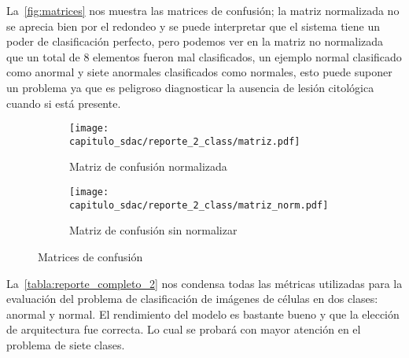\begin{table}[H]
    \centering
    \caption{Reporte de clasificación binario}\label{tabla:reporte_2}
    \end{table}

La~\autoref{fig:matrices} nos muestra las matrices de confusión; la matriz
normalizada no se aprecia bien por el redondeo y se puede interpretar que el
sistema tiene un poder de clasificación perfecto, pero podemos ver en la matriz
no normalizada que un total de 8 elementos fueron mal clasificados, un ejemplo
normal clasificado como anormal y siete anormales clasificados como normales,
esto puede suponer un problema ya que es peligroso diagnosticar la ausencia de
lesión citológica cuando si está presente.

\begin{figure}[H]
    \centering
    \begin{subfigure}[b]{0.6\textwidth}
        \centering 
        \texttt{[image: capitulo\_sdac/reporte\_2\_class/matriz.pdf]}
        \caption{Matriz de confusión normalizada}\label{fig:matriz_norm}
        \end{subfigure}
    \begin{subfigure}[b]{0.6\textwidth}
        \centering 
        \texttt{[image: capitulo\_sdac/reporte\_2\_class/matriz\_norm.pdf]}
        \caption{Matriz de confusión sin normalizar}\label{fig:matriz_sin}
    \end{subfigure}%
        \caption{Matrices de confusión}\label{fig:matrices}
\end{figure}
    
La~\autoref{tabla:reporte_completo_2} nos condensa todas las métricas utilizadas
para la evaluación del problema de clasificación de imágenes de células en dos
clases: anormal y normal. El rendimiento del modelo es bastante bueno y que la
elección de arquitectura fue correcta. Lo cual se probará con mayor atención en
el problema de siete clases. 

